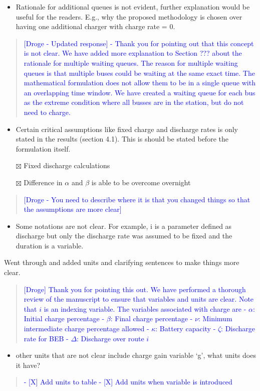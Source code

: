 \documentclass[11pt,a4paper,final]{article}
\begin{document}
\begin{itemize}
\item Rationale for additional queues is not evident, further explanation would be useful for the readers. E.g., why the proposed methodology is chosen over having one additional charger with charge rate = 0.
\end{itemize}


\begin{quote}
\textcolor{blue}{[Droge - Updated response] - Thank you for pointing out that this concept is not clear. We have added more explanation to Section ??? about the rationale for multiple waiting queues. The reason for multiple waiting queues is that multiple buses could be waiting at the same exact time. The mathematical formulation does not allow them to be in a single queue with an overlapping time window. We have created a waiting queue for each bus as the extreme condition where all busses are in the station, but do not need to charge.}
\end{quote}

\begin{itemize}
\item Certain critical assumptions like fixed charge and discharge rates is only stated in the results (section 4.1). This is should be stated before the formulation itself.

\item[{$\boxtimes$}] Fixed discharge calculations
\item[{$\boxtimes$}] Difference in \(\alpha\) and \(\beta\) is able to be overcome overnight
\end{itemize}

\begin{quote}
\textcolor{blue}{[Droge - You need to describe where it is that you changed things so that the assumptions are more clear]}
\end{quote}

\begin{itemize}
\item Some notations are not clear. For example, i is a parameter defined as discharge but only the discharge rate was assumed to be fixed and the duration is a variable.
\end{itemize}

Went through and added units and clarifying sentences to make things more clear.

\begin{quote}
\textcolor{blue}{[Droge] Thank you for pointing this out. We have performed a thorough review of the manuscript to ensure that variables
and units are clear. Note that $i$ is an indexing variable. The variables associated with charge are
- $\alpha$: Initial charge percentage
- $\beta$: Final charge percentage
- $\nu$: Minimum intermediate charge percentage allowed
- $\kappa$: Battery capacity
- $\zeta$: Discharge rate for BEB
- $\Delta$: Discharge over route $i$}
\end{quote}

\begin{itemize}
\item other units that are not clear include charge gain variable ‘g’, what units does it have?
\end{itemize}

\begin{quote}
\textcolor{blue}
{- [X] Add units to table
- [X] Add units when variable is introduced}
\end{quote}
\end{document}
